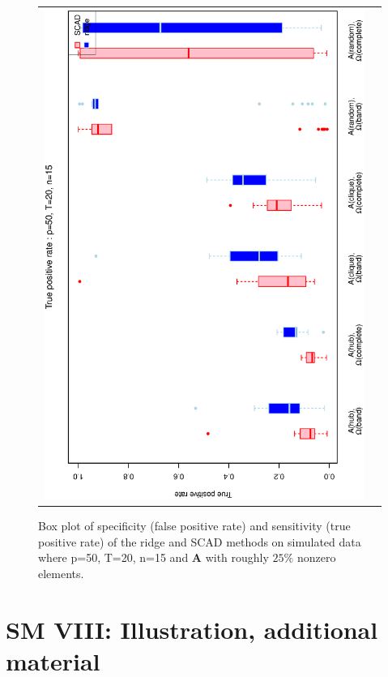 \documentclass[a4paper]{article}
\begin{document}
\begin{figure}[h!]
\begin{tabular}{cc}
\includegraphics[scale=0.45,angle=270]{ROCtpr50T20N15_25.eps}
\end{tabular}
\caption{Box plot of specificity (false positive rate) and sensitivity (true positive rate) of the ridge and SCAD methods on simulated data where p=50, T=20, n=15 and $\mathbf{A}$ with roughly $25\%$ nonzero elements.}
\label{figSM:RocP50T20N15_25}
\end{figure}


\afterpage{\clearpage}

\newpage


\newpage
\section*{SM VIII: Illustration, additional material }
\end{document}
